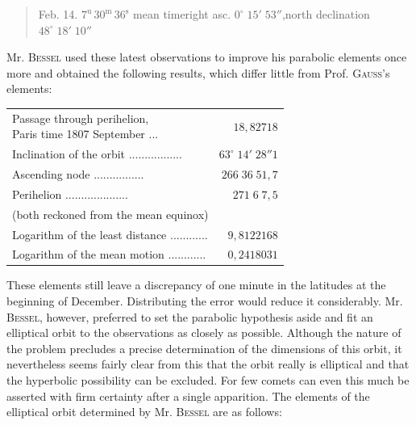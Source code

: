 \begin{quote}
Feb. 14. $7^{\text{u}}\,30^{\text{m}}\,36^{\text{s}}$ mean time\quad right asc. $0^\circ\;15'\;53''$,\quad north declination $48^\circ\;18'\;10''$
\end{quote}

\par\indent Mr. \textsc{Bessel} used these latest observations to improve his parabolic elements once more and obtained the following results, which differ little from Prof. \textsc{Gauss}’s elements:


\begin{center}\fontsize{9}{11}\selectfont\setlength{\tabcolsep}{3pt}\renewcommand{\arraystretch}{1.15}\begin{tabular}{lr}
\shortstack[l]{Passage through perihelion,\\Paris time 1807 September} .\;.\;.\; & $18{,}82718$\\
Inclination of the orbit .\;.\;.\;.\;.\;.\;.\;.\;.\;.\;.\;.\;.\;.\;.\;.\;.\; & $63^\circ\;14'\;28''1$\\
Ascending node .\;.\;.\;.\;.\;.\;.\;.\;.\;.\;.\;.\;.\;.\;.\;.\; & $266\;36\;51{,}7$\\
Perihelion .\;.\;.\;.\;.\;.\;.\;.\;.\;.\;.\;.\;.\;.\;.\;.\;.\;.\;.\;.\; & $271\;6\;7{,}5$\\
\multicolumn{2}{l}{(both reckoned from the mean equinox)}\\
Logarithm of the least distance .\;.\;.\;.\;.\;.\;.\;.\;.\;.\;.\;.\; & $9{,}8122168$\\
Logarithm of the mean motion .\;.\;.\;.\;.\;.\;.\;.\;.\;.\;.\;.\; & $0{,}2418031$\\
\end{tabular}\end{center}


\par\indent These elements still leave a discrepancy of one minute in the latitudes at the beginning of December. Distributing the error would reduce it considerably. Mr. \textsc{Bessel}, however, preferred to set the parabolic hypothesis aside and fit an elliptical orbit to the observations as closely as possible. Although the nature of the problem precludes a precise determination of the dimensions of this orbit, it nevertheless seems fairly clear from this that the orbit really is elliptical and that the hyperbolic possibility can be excluded. For few comets can even this much be asserted with firm certainty after a single apparition. The elements of the elliptical orbit determined by Mr. \textsc{Bessel} are as follows:


